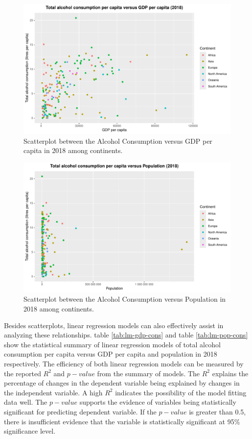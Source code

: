\documentclass[11pt,a4paper,]{article}
\begin{document}
\begin{figure}

{\centering \includegraphics[width=0.7\linewidth]{alcohol_analysis_files/figure-latex/GDP-vs-Consumption-1} 

}

\caption{Scatterplot between the Alcohol Consumption versus GDP per capita in 2018 among continents.}\label{fig:GDP-vs-Consumption}
\end{figure}
\begin{figure}

{\centering \includegraphics[width=0.7\linewidth]{alcohol_analysis_files/figure-latex/Population-vs-Consumption-1} 

}

\caption{Scatterplot between the Alcohol Consumption versus Population in 2018 among continents.}\label{fig:Population-vs-Consumption}
\end{figure}

Besides scatterplots, linear regression models can also effectively assist in analyzing these relationships. table \ref{tab:lm-gdp-cons} and table \ref{tab:lm-pop-cons} show the statistical summary of linear regression models of total alcohol consumption per capita versus GDP per capita and population in 2018 respectively. The efficiency of both linear regression models can be measured by the reported \(R^2\) and \(p-value\) from the summary of models. The \(R^2\) explains the percentage of changes in the dependent variable being explained by changes in the independent variable. A high \(R^2\) indicates the possibility of the model fitting data well. The \(p-value\) supports the evidence of variables being statistically significant for predicting dependent variable. If the \(p-value\) is greater than 0.5, there is insufficient evidence that the variable is statistically significant at 95\% significance level.
\end{document}
